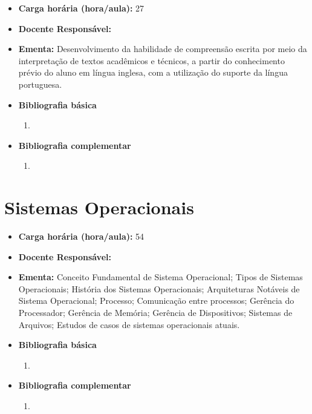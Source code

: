 \documentclass[11pt,fleqn]{book} %
\begin{document}
\begin{itemize}
	\item \textbf{Carga horária (hora/aula):} 27
	\item \textbf{Docente Responsável:}~
	\item \textbf{Ementa:} 
	Desenvolvimento da habilidade de compreensão escrita por meio da interpretação de textos acadêmicos e
	técnicos, a partir do conhecimento prévio do aluno em língua inglesa, com a utilização do suporte da língua
	portuguesa.
	\item \textbf{Bibliografia básica}
	\begin{enumerate}
		\item 
	\end{enumerate}
	\item \textbf{Bibliografia complementar}
	\begin{enumerate}
		\item 
	\end{enumerate}	
\end{itemize}


\newpage
\section{Sistemas Operacionais}\label{disc:sistop}

\begin{itemize}
	\item \textbf{Carga horária (hora/aula):} 54
	\item \textbf{Docente Responsável:}~
	\item \textbf{Ementa:} 
	Conceito Fundamental de Sistema Operacional; 
	Tipos de Sistemas Operacionais; 
	História dos Sistemas Operacionais; 
	Arquiteturas Notáveis de Sistema Operacional; 
	Processo; 
	Comunicação entre processos; 
	Gerência do Processador; 
	Gerência de Memória; 
	Gerência de Dispositivos; 
	Sistemas de Arquivos; 
	Estudos de casos de sistemas operacionais atuais.
	\item \textbf{Bibliografia básica}
	\begin{enumerate}
		\item 
	\end{enumerate}
	\item \textbf{Bibliografia complementar}
	\begin{enumerate}
		\item 
	\end{enumerate}	
\end{itemize}
\end{document}
